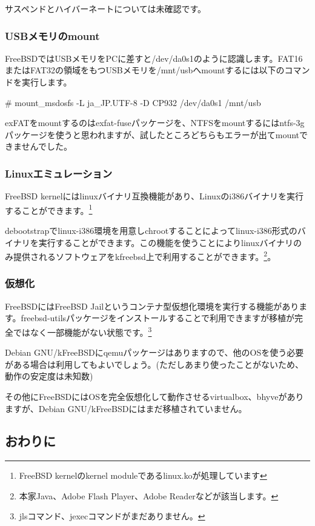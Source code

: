 \documentclass[mingoth,a4paper]{jsarticle}
\begin{document}
サスペンドとハイバーネートについては未確認です。

\subsubsection{USBメモリのmount}

FreeBSDではUSBメモリをPCに差すと/dev/da0s1のように認識します。FAT16またはFAT32の領域をもつUSBメモリを/mnt/usbへmountするには以下のコマンドを実行します。

\begin{commandline}
# mount_msdosfs -L ja_JP.UTF-8 -D CP932 /dev/da0s1 /mnt/usb
\end{commandline}

exFATをmountするのはexfat-fuseパッケージを、NTFSをmountするにはntfs-3gパッケージを使うと思われますが、試したところどちらもエラーが出てmountできませんでした。

\subsubsection{Linuxエミュレーション}

FreeBSD kernelにはlinuxバイナリ互換機能があり、Linuxのi386バイナリを実行することができます。\footnote{FreeBSD kernelのkernel moduleであるlinux.koが処理しています}

debootstrapでlinux-i386環境を用意しchrootすることによってlinux-i386形式のバイナリを実行することができます。この機能を使うことによりlinuxバイナリのみ提供されるソフトウェアをkfreebsd上で利用することができます。\footnote{本家Java、Adobe Flash Player、Adobe Readerなどが該当します。}。

\subsubsection{仮想化}

FreeBSDにはFreeBSD Jailというコンテナ型仮想化環境を実行する機能があります。freebsd-utilsパッケージをインストールすることで利用できますが移植が完全ではなく一部機能がない状態です。\footnote{jlsコマンド、jexecコマンドがまだありません。}

Debian GNU/kFreeBSDにqemuパッケージはありますので、他のOSを使う必要がある場合は利用してもよいでしょう。(ただしあまり使ったことがないため、動作の安定度は未知数)

その他にFreeBSDにはOSを完全仮想化して動作させるvirtualbox、bhyveがありますが、Debian GNU/kFreeBSDにはまだ移植されていません。

\subsection{おわりに}
\end{document}
